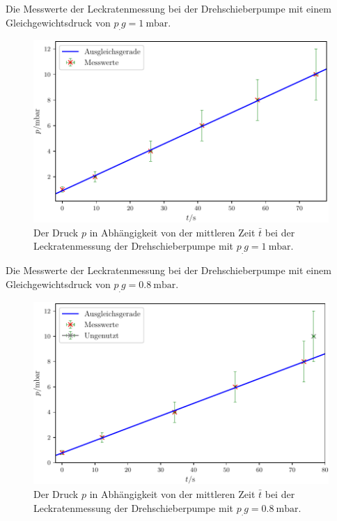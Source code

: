 \newpage
\begin{table}
\centering
\caption{Die Messwerte der Leckratenmessung bei der Drehschieberpumpe mit einem Gleichgewichtsdruck von $p_.g = \SI{1}{\milli\bar}$.}

\label{tab:DL1}
\end{table}

\begin{figure}
\centering
\includegraphics[width=\linewidth-70pt,height=\textheight-70pt,keepaspectratio]{content/images/DL1.pdf}
\caption{Der Druck $p$ in Abhängigkeit von der mittleren Zeit $\bar{t}$ bei der Leckratenmessung der Drehschieberpumpe  mit $p_.g = \SI{1}{\milli\bar}$.}
\label{fig:DL1}
\end{figure}

\newpage
\begin{table}
\centering
\caption{Die Messwerte der Leckratenmessung bei der Drehschieberpumpe mit einem Gleichgewichtsdruck von $p_.g = \SI{0.8}{\milli\bar}$.}

\label{tab:DL2}
\end{table}

\begin{figure}
\centering
\includegraphics[width=\linewidth-70pt,height=\textheight-70pt,keepaspectratio]{content/images/DL2.pdf}
\caption{Der Druck $p$ in Abhängigkeit von der mittleren Zeit $\bar{t}$ bei der Leckratenmessung der Drehschieberpumpe  mit $p_.g = \SI{0.8}{\milli\bar}$.}
\label{fig:DL2}
\end{figure}

